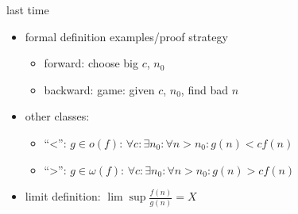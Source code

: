 \begin{comment}
    \begin{frame}{last time}
    \begin{itemize}
    \item arrays and multi-dimensional arrays in C++
        \begin{itemize}
        \item row-major order
        \end{itemize}
    \item command line parameters
    \item asymptotic comparisions
        \begin{itemize}
        \item ignore constant factors, only big behavior
        \item compute theoretically, not empirically
        \item make algorithm decisions w/ implementation
        \end{itemize}
    \item classes: $O(f)$: $\le f$; $\Omega(f)$: $\ge f$; $\Theta(f)$: $= f$
    \item formal definition: $\le cf(n)$ for all $n \ge n_0$
    \end{itemize}
\end{frame}
\end{comment}

\begin{frame}{last time}
    \begin{itemize}
    \item formal definition examples/proof strategy
        \begin{itemize}
        \item forward: choose big $c$, $n_0$
        \item backward: game: given $c$, $n_0$, find bad $n$
        \end{itemize}
    \item other classes:
        \begin{itemize}
            \item ``<'': $g\in o(f)$: $\forall c: \exists n_0: \forall n > n_0: g(n) < c f(n)$
            \item ``>'': $g\in \omega(f)$: $\forall c: \exists n_0: \forall n > n_0: g(n) > c f(n)$
        \end{itemize}
    \item limit definition: $\lim\sup \frac{f(n)}{g(n)} = X$
    \end{itemize}
\end{frame}
